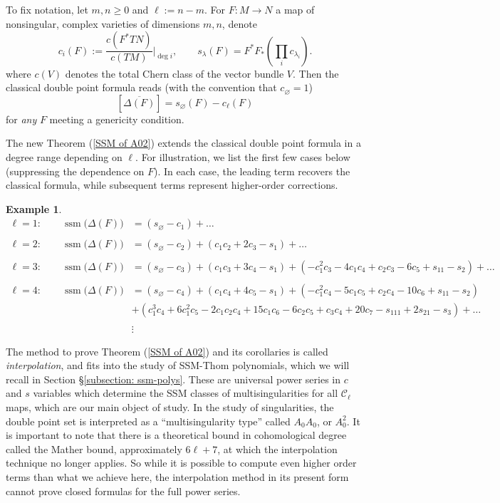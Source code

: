 \documentclass[11pt]{article}
\theoremstyle{plain}
\theoremstyle{definition}
\newtheorem{example}[fact]{Example}
\theoremstyle{definition}
\DeclareMathOperator{\ssm}{ssm}
\let\emptyset\varnothing
\begin{document}
To fix notation, let $m,n\geq 0$ and $\ell:=n-m$. For $F: M \to N$ a map of nonsingular, complex varieties of dimensions $m,n$, denote 
\[
c_i(F):=\frac{c(F^*TN)}{c(TM)}\Bigg|_{\deg i},\quad\quad s_\lambda(F) = F^*F_*\left(\prod_ic_{\lambda_i}\right).
\]
where $c(V)$ denotes the total Chern class of the vector bundle $V$. Then the classical double point formula reads (with the convention that $c_\emptyset=1$)
\[
\left[\overline{\Delta(F)}\right] = s_\emptyset(F)-c_\ell(F)
\]
for \textit{any} $F$ meeting a genericity condition. 

The new Theorem (\ref{SSM of A02}) extends the classical double point formula in a degree range depending on $\ell$. For illustration, we list the first few cases below (suppressing the dependence on $F$). In each case, the leading term recovers the classical formula, while subsequent terms represent higher-order corrections.

\begin{example}\label{ex: SSM A02}
\begin{align*}
\ell=1 : \quad\quad \ssm\big(\Delta(F)\big) &= (s_\emptyset-c_1)+\dots\\\\
\ell=2 : \quad\quad \ssm\big(\Delta(F)\big) &= (s_\emptyset-c_2) + (c_1c_2+2c_3-s_1) + \dots\\\\
\ell=3 : \quad\quad \ssm\big(\Delta(F)\big) &= (s_\emptyset-c_3) + (c_1c_3+3c_4-s_1) + (-c_1^2c_3-4c_1c_4+c_2c_3-6c_5+s_{11}-s_2)+\dots \\\\
\ell=4 : \quad\quad \ssm\big(\Delta(F)\big) &= (s_\emptyset-c_4) + (c_1c_4+4c_5-s_1) + (-c_1^2c_4-5c_1c_5+c_2c_4-10c_6+s_{11}-s_2) \\
&+(c_{1}^{3}c_{{4}}+6c_{1}^{2}c_{5}-2c_{1}c_{2}c_{4}+
15c_{{1}}c_{{6}}-6c_{{2}}c_{{5}}+c_{{3}}c_{{4}}+20c_{{7}}-s_{111} +2s_{21}-s_3) +\dots\\\\
 &\vdots
\end{align*}
\end{example}
The method to prove Theorem (\ref{SSM of A02}) and its corollaries is called \textit{interpolation}, and fits into the study of SSM-Thom polynomials, which we will recall in Section \S\ref{subsection: ssm-polys}. These are universal power series in $c$ and $s$ variables which determine the SSM classes of multisingularities for all $\mathcal C_\ell$ maps, which are our main object of study. In the study of singularities, the double point set is interpreted as a ``multisingularity type'' called $A_0A_0$, or $A_0^2$. It is important to note that there is a theoretical bound in cohomological degree called the Mather bound, approximately $6\ell+7$, at which the interpolation technique no longer applies. So while it is possible to compute even higher order terms than what we achieve here, the interpolation method in its present form cannot prove closed formulas for the full power series. 
\end{document}
